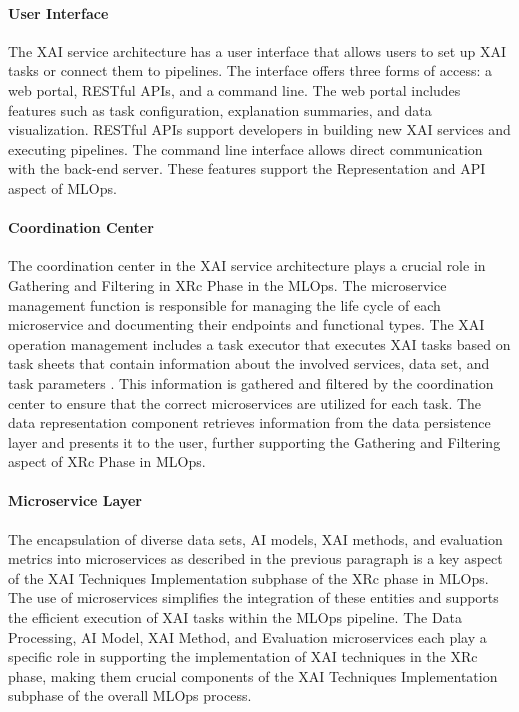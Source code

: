 \documentclass[conference]{IEEEtran}
\begin{document}
\paragraph{User Interface} The XAI service architecture has a user interface that allows users to set up XAI tasks or connect them to pipelines. The interface offers three forms of access: a web portal, RESTful APIs, and a command line. The web portal includes features such as task configuration, explanation summaries, and data visualization. RESTful APIs support developers in building new XAI services and executing pipelines. The command line interface allows direct communication with the back-end server. These features support the Representation and API aspect of MLOps.
\paragraph{Coordination Center} The coordination center in the XAI service architecture plays a crucial role in Gathering and Filtering in XRc Phase in the MLOps. The microservice management function is responsible for managing the life cycle of each microservice and documenting their endpoints and functional types. The XAI operation management includes a task executor that executes XAI tasks based on task sheets that contain information about the involved services, data set, and task parameters \cite{makinen}. This information is gathered and filtered by the coordination center to ensure that the correct microservices are utilized for each task. The data representation component retrieves information from the data persistence layer and presents it to the user, further supporting the Gathering and Filtering aspect of XRc Phase in MLOps.
\paragraph{Microservice Layer} The encapsulation of diverse data sets, AI models, XAI methods, and evaluation metrics into microservices as described in the previous paragraph is a key aspect of the XAI Techniques Implementation subphase of the XRc phase in MLOps. The use of microservices simplifies the integration of these entities and supports the efficient execution of XAI tasks within the MLOps pipeline. The Data Processing, AI Model, XAI Method, and Evaluation microservices each play a specific role in supporting the implementation of XAI techniques in the XRc phase, making them crucial components of the XAI Techniques Implementation subphase of the overall MLOps process.
\end{document}
